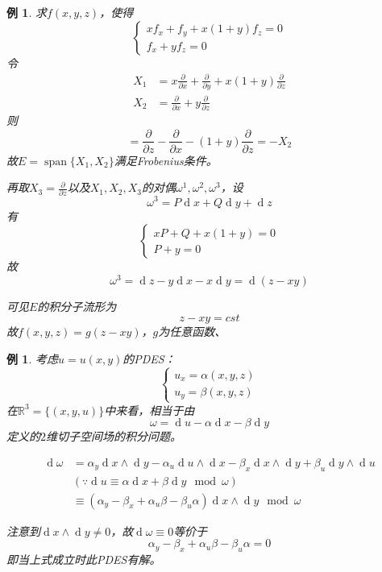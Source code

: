 \documentclass[winfonts,UTF8,c5size,a4paper,fancyhdr,hyperref,titlepage,nocap]{ctexart}
\newtheorem{exa}[thm]{例}
\theoremstyle{definition}
\theoremstyle{remark}
\numberwithin{equation}{subsection}
\newcommand{\Real}{\mathbb{R}}
\newcommand{\dd}{\operatorname{d}}
\newcommand{\pfrac}[2]{\frac{\partial{#1}}{\partial{#2}}}
\newcommand{\spa}{\operatorname{span}}
\begin{document}
\begin{exa}
  求$f(x,y,z)$，使得
\begin{equation*}
\begin{cases}
xf_x+f_y+x(1+y)f_z=0\\
f_x+yf_z=0
\end{cases}
\end{equation*}
令
\begin{align*}
X_1&=x\pfrac{}{x}+\pfrac{}{y}+x(1+y)\pfrac{}{z}\\
X_2&=\pfrac{}{x}+y\pfrac{}{z}
\end{align*}
则
\begin{equation*}
[X_1,X_2]=\pfrac{}{z}-\pfrac{}{x}-(1+y)\pfrac{}{z}=-X_2
\end{equation*}
故$E=\spa\{X_1,X_2\}$满足Frobenius条件。

再取$X_3=\pfrac{}{z}$以及$X_1,X_2,X_3$的对偶$\omega^1,\omega^2,\omega^3$，设
\begin{equation*}
\omega^3=P\dd x+Q\dd y+\dd z
\end{equation*}
有
\begin{equation*}
\begin{cases}
xP+Q+x(1+y)=0\\
P+y=0
\end{cases}
\end{equation*}
故
\begin{equation*}
\omega^3=\dd z-y\dd x-x\dd y=\dd(z-xy)
\end{equation*}

可见$E$的积分子流形为
\begin{equation*}
z-xy=cst
\end{equation*}
故$f(x,y,z)=g(z-xy)$，$g$为任意函数、
\end{exa}
\begin{exa}
  考虑$u=u(x,y)$的PDES：
\begin{equation*}
\begin{cases}
u_x=\alpha(x,y,z)\\
u_y=\beta(x,y,z)
\end{cases}
\end{equation*}
在$\Real^3=\{(x,y,u)\}$中来看，相当于由
\begin{equation*}
\omega=\dd u-\alpha\dd x-\beta\dd y
\end{equation*}
定义的$2$维切子空间场的积分问题。

\begin{align*}
\dd\omega&=\alpha_y\dd x\wedge\dd y-\alpha_u\dd u\wedge\dd x-\beta_x\dd x\wedge\dd y+\beta_u\dd y\wedge\dd u\\
          &(\because\dd u\equiv\alpha\dd x+\beta\dd y\mod \omega)\\
          &\equiv(\alpha_y-\beta_x+\alpha_u\beta-\beta_u\alpha)\dd x\wedge\dd y\mod\omega
\end{align*}

注意到$\dd x\wedge\dd y\neq0$，故$\dd\omega\equiv0$等价于
\begin{equation*}
  \alpha_y-\beta_x+\alpha_u\beta-\beta_u\alpha=0
\end{equation*}
即当上式成立时此PDES有解。
\end{exa}
\end{document}
